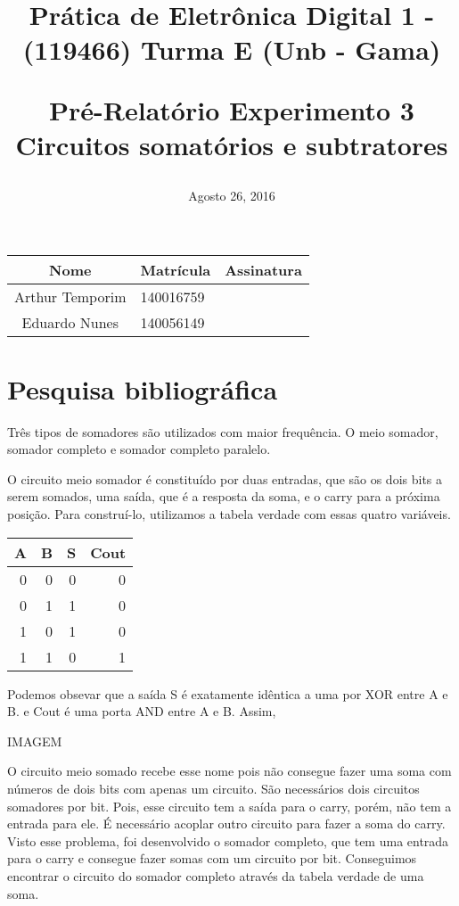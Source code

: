 \documentclass[12pts]{article}
\title{
	Prática de Eletrônica Digital 1 - (119466)
	\singlespacing
		Turma E (Unb - Gama)
	\singlespacing
	\begin{midpage}
	\begin {large}
		Pré-Relatório Experimento 3
		\singlespace
		Circuitos somatórios e subtratores
	\end {large}
	\end{midpage}
}
\date{Agosto 26, 2016}
\begin{document}
\maketitle	
\begin{center}

\begin{tabular}{|c|l|r|}
\hline
Nome & Matrícula & Assinatura\\
\hline
Arthur Temporim & 140016759 & \\
\hline	
Eduardo Nunes & 140056149 & \\
\hline	
\end{tabular}

\end{center}

\pagebreak

\section{Pesquisa bibliográfica}

Três tipos de somadores são utilizados com maior frequência. O meio somador, somador completo e somador completo paralelo.
	
O circuito meio somador é constituído por duas entradas, que são os dois bits a serem somados, uma saída, que é a resposta da soma, e o carry para a próxima posição. Para construí-lo, utilizamos a tabela verdade com essas quatro variáveis. 

\begin{center}
	\begin{tabular}{|r|r|r|r|}
		\hline
		A & B & S & Cout \\
		\hline
		0 & 0 & 0 & 0 \\				
		\hline
		0 & 1 & 1 & 0 \\
		\hline
		1 & 0 & 1 & 0 \\
		\hline
		1 & 1 & 0 & 1 \\
		\hline
	\end{tabular}
\end{center}

Podemos obsevar que a saída S é exatamente idêntica a uma por XOR entre A e B. e Cout é uma porta AND entre A e B. Assim, 

IMAGEM 

O circuito meio somado recebe esse nome pois não consegue fazer uma soma com números de dois bits com apenas um circuito. São necessários dois circuitos somadores por bit.  Pois, esse circuito tem a saída para o carry, porém, não tem a entrada para ele. É necessário acoplar outro circuito para fazer a soma do carry. Visto esse problema, foi desenvolvido o somador completo, que tem uma entrada para o carry e consegue fazer somas com um circuito por bit. Conseguimos encontrar o circuito do somador completo através da tabela verdade de uma soma.
\end{document}

